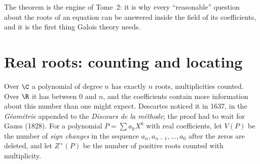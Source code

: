 The theorem is the engine of Tome~2: it is why every ``reasonable'' question about the roots of an equation can be answered inside the field of its
coefficients, and it is the first thing Galois theory needs.

\section{Real roots: counting and locating}

Over $\C$ a polynomial of degree $n$ has exactly $n$ roots, multiplicities counted. Over $\R$ it has between $0$ and $n$, and the coefficients
contain more information about this number than one might expect. Descartes noticed it in 1637, in the \emph{G\'eom\'etrie} appended to the
\emph{Discours de la m\'ethode}; the proof had to wait for Gauss (1828). For a polynomial $P=\sum a_kX^k$ with real coefficients, let $V(P)$ be the
number of \emph{sign changes} in the sequence $a_n,a_{n-1},\dots,a_0$ after the zeros are deleted, and let $Z^+(P)$ be the number of positive roots
counted with multiplicity.

